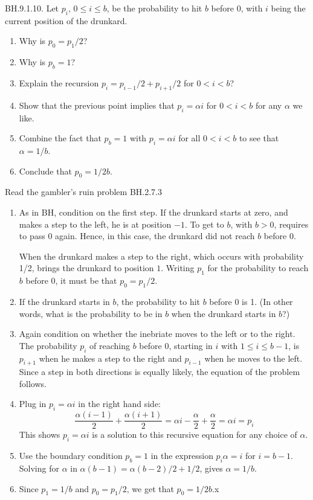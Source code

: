 \begin{exercise}
  BH.9.1.10.  Let $p_i$, $0\leq i\leq b$, be the probability to hit $b$ before $0$, with $i$ being the current position of the drunkard.
\begin{enumerate}
\item Why is $p_0=p_1/2$?
\item Why is $p_{b}=1$?
\item Explain the recursion $p_i=p_{i-1}/2 + p_{i+1}/2$ for $0 < i <b$?
\item Show that the previous point implies that $p_i =  \alpha i$ for $0<i<b$ for any $\alpha$ we like.
\item Combine the fact that $p_{b}=1$ with $p_{i} = \alpha i$ for all $0<i<b$ to see that $\alpha=1/b$.
\item Conclude that $p_0=1/2b$.
\end{enumerate}
\begin{hint}
  Read the gambler's ruin problem BH.2.7.3
\end{hint}

\begin{solution}
  \begin{enumerate}
    \item As in BH, condition on the first step. If the drunkard starts at zero, and makes a step to the left, he is at position $-1$. To get to $b$, with $b>0$, requires to pass $0$ again. Hence, in this case, the drunkard did not reach $b$ before 0.

    When the drunkard makes a step to the right, which occurs with probability 1/2, brings the drunkard to position $1$. Writing $p_{1}$ for the probability to reach $b$ before $0$, it must be that $p_0 = p_1/2$.
    \item If the drunkard starts in $b$, the probability to hit $b$ before $0$ is 1. (In other words, what is the probability to be in $b$ when the drunkard starts in $b$?)
    \item Again condition on whether the inebriate moves to the left or to the right.  The probability $p_{i}$ of reaching $b$ before 0, starting in $i$ with $1\leq i \leq b-1$, is $p_{i+1}$ when he makes a step to the right and $p_{i-1}$ when he moves to the left.  Since a step in both directions is equally likely, the equation of the problem follows.
    \item Plug in $p_i = \alpha i$ in the right hand side:
      \begin{equation*}
    \frac{\alpha(i-1)}{2} + \frac{\alpha(i+1)}{2} = \alpha i - \frac{\alpha}{2} + \frac{\alpha}{2} = \alpha i = p_i
      \end{equation*}
    This shows $p_i = \alpha i$ is a solution to this recursive equation for any choice of $\alpha$.
    \item Use the boundary condition $ p_b = 1$ in the expression $p_{i}\alpha = i$ for $i=b-1$. Solving for $\alpha$ in $\alpha(b-1) = \alpha(b-2)/2+1/2$,
     gives $\alpha=1/b$.
    \item Since $p_1=1/b$ and $p_0 = p_1 / 2$, we get that $p_{0}=1/2b$.x  \end{enumerate}


\end{solution}
\end{exercise}

